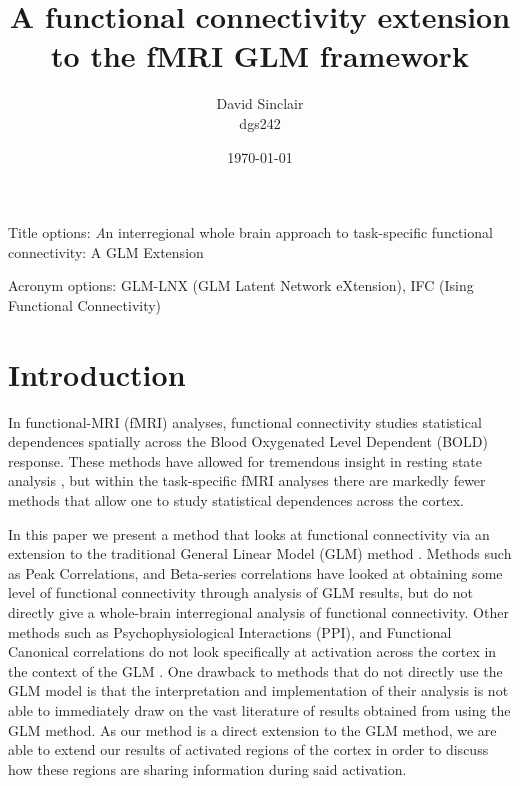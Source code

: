 \documentclass[12pt]{article}
\begin{document}
\title{A functional connectivity extension to the fMRI GLM framework}
\author{David Sinclair\\
dgs242}
\date{\today}
\maketitle


Title options:  {\emph An interregional whole brain approach to task-specific functional connectivity: A GLM Extension}

Acronym options: GLM-LNX (GLM Latent Network eXtension), IFC (Ising Functional Connectivity)

\section{Introduction}	

In functional-MRI (fMRI) analyses, functional connectivity studies statistical dependences spatially across the Blood Oxygenated Level Dependent (BOLD) response.  These methods have allowed for tremendous insight in resting state analysis \cite{van2010exploring}, but within the task-specific fMRI analyses there are markedly fewer methods that allow one to study statistical dependences across the cortex.

In this paper we present a method that looks at functional connectivity via an extension to the traditional General Linear Model (GLM) method \cite{worsley1995analysis, friston2002classical}.  Methods such as Peak Correlations, and Beta-series correlations \cite{sadaghiani2010relation, rissman2004measuring} have looked at obtaining some level of functional connectivity through analysis of GLM results, but do not directly give a whole-brain interregional analysis of functional connectivity.   Other methods such as Psychophysiological Interactions (PPI),  and Functional Canonical correlations do not look specifically at activation across the cortex in the context of the GLM \cite{friston1997psychophysiological, friman2001detection}.  One drawback to methods that do not directly use the GLM model is that the interpretation and implementation of their analysis is not able to immediately draw on the vast literature of results obtained from using the GLM method.  As our method is a direct extension to the GLM method, we are able to extend our results of activated regions of the cortex in order to discuss how these regions are sharing information during said activation.
\end{document}
